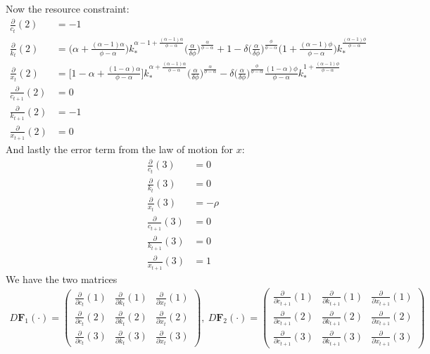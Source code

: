 \documentclass[a4paper]{article}
\theoremstyle{definition}
\begin{document}
Now the resource constraint:
	\begin{align*}
	\frac{\partial}{c_{t}}(2) 		&= -1\\
	\frac{\partial}{k_{t}}(2) 		&= \Big( \alpha+\frac{(\alpha-1)\alpha}{\phi-\alpha} \Big)k_{*}^{\alpha-1+\frac{(\alpha-1)\alpha}{\phi-\alpha}} \Big( \frac{\alpha}{\delta\phi}\Big)^{\frac{\alpha}{\phi-\alpha}}+1-\delta \Big( \frac{\alpha}{\delta\phi}\Big)^{\frac{\phi}{\phi-\alpha}} \Big( 1+\frac{(\alpha-1)\phi}{\phi-\alpha} \Big) k_{*}^{\frac{(\alpha-1)\phi}{\phi-\alpha}} \\
	\frac{\partial}{x_{t}}(2) 		&= \Big[ 1-\alpha+\frac{(1-\alpha)\alpha}{\phi-\alpha} \Big]k_{*}^{\alpha+\frac{(\alpha-1)\alpha}{\phi-\alpha}} \Big( \frac{\alpha}{\delta\phi}\Big)^{\frac{\alpha}{\phi-\alpha}}-\delta \Big( \frac{\alpha}{\delta\phi}\Big)^{\frac{\phi}{\phi-\alpha}}\frac{(1-\alpha)\phi}{\phi-\alpha}k_{*}^{1+\frac{(\alpha-1)\phi}{\phi-\alpha}} \\
	\frac{\partial}{c_{t+1}}(2) 	&= 0\\			
	\frac{\partial}{k_{t+1}}(2) 	&= -1\\
	\frac{\partial}{x_{t+1}}(2) 	&= 0
	\end{align*}	
And lastly the error term from the law of motion for $x$:
	\begin{align*}
	\frac{\partial}{c_{t}}(3) 		&= 0 \\
	\frac{\partial}{k_{t}}(3) 		&= 0 \\
	\frac{\partial}{x_{t}}(3) 		&= -\rho \\
	\frac{\partial}{c_{t+1}}(3) 	&= 0 \\			
	\frac{\partial}{k_{t+1}}(3) 	&= 0 \\
	\frac{\partial}{x_{t+1}}(3) 	&= 1
	\end{align*}
We have the two matrices
	\begin{align*}
	D \mathbf F_1(\cdot) = \begin{pmatrix} \frac{\partial}{\partial c_{t}}(1) & \frac{\partial}{\partial k_t}(1) & \frac{\partial}{\partial x_t}(1) \\ \frac{\partial}{\partial c_{t}}(2) & \frac{\partial}{\partial k_t}(2) & \frac{\partial}{\partial x_t}(2) \\ \frac{\partial}{\partial c_{t}}(3) & \frac{\partial}{\partial k_t}(3) & \frac{\partial}{\partial x_t}(3)  \end{pmatrix},\
	D \mathbf F_2(\cdot) = \begin{pmatrix} \frac{\partial}{\partial c_{t+1}}(1) & \frac{\partial}{\partial k_{t+1}}(1) & \frac{\partial}{\partial x_{t+1}}(1) \\ \frac{\partial}{\partial c_{t+1}}(2) & \frac{\partial}{\partial k_{t+1}}(2) & \frac{\partial}{\partial x_{t+1}}(2) \\ \frac{\partial}{\partial c_{t+1}}(3) & \frac{\partial}{\partial k_{t+1}}(3) & \frac{\partial}{\partial x_{t+1}}(3)  \end{pmatrix}
	\end{align*}	
	
\end{document}
